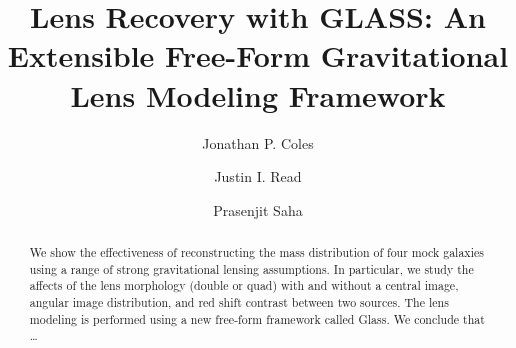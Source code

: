 \documentclass[onecolumn,galley]{mn2e}
\title[GLASS]{Lens Recovery with GLASS: An Extensible Free-Form Gravitational Lens Modeling Framework}
\author{%
Jonathan P. Coles 
\and 
Justin I. Read
\and 
Prasenjit Saha 
}
\newcommand{\Glass}{{\sc Glass}}
\begin{document}
\maketitle


\begin{abstract}
We show the effectiveness of reconstructing the mass distribution of four mock galaxies using
a range of strong gravitational lensing assumptions. In particular, we study
the affects of the lens morphology (double or quad) with and without a central
image, angular image distribution, and red shift contrast between two sources.
The lens modeling is performed using a new free-form framework called \Glass.
We conclude that \dots





\end{abstract}
\end{document}
